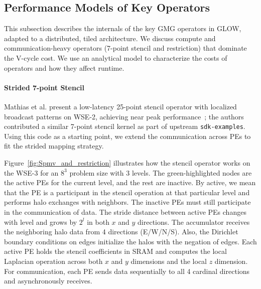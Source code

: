 \documentclass[conference]{IEEEtran}
\begin{document}
        \subsection{Performance Models of Key Operators}
            \label{sec:perfmodel}
            This subsection describes the internals of the key GMG operators in GLOW, adapted to a distributed, tiled architecture. We discuss compute and communication-heavy operators (7-point stencil and restriction) that dominate the V-cycle cost. We use an analytical model to characterize the costs of operators and how they affect runtime.

            \paragraph{Strided 7-point Stencil}
            Mathias et al. present  %
            a low-latency 25-point stencil operator with localized broadcast patterns on WSE-2, achieving near peak performance~\cite{mathias}; the authors contributed a   similar 7-point stencil kernel as part of upstream \texttt{sdk-examples}.  Using this code as a starting point, we extend the communication across PEs to fit the strided mapping strategy.

            Figure~\ref{fig:Spmv_and_restriction} illustrates how the stencil operator works on the WSE-3 for an \(8^3\) problem size with 3 levels. %
            The green-highlighted nodes are the active PEs for the current level, and the rest are inactive. By active, we mean that the PE is a participant in the stencil operation at that particular level and performs halo exchanges with neighbors. The inactive PEs %
            must still participate in the communication of data. The stride distance between active PEs changes with level and grows by \(2^l\) in both \(x\) and \(y\) directions.
            The accumulator receives the neighboring halo data from 4 directions (E/W/N/S).   Also, the Dirichlet boundary conditions on edges initialize the halos with the negation of edges. Each active PE holds the stencil coefficients in SRAM and computes the local Laplacian operation across both \(x\) and \(y\) dimensions and the local \(z\) dimension. %
            For communication, each PE sends data sequentially to all 4 cardinal directions and asynchronously receives. %
\end{document}
